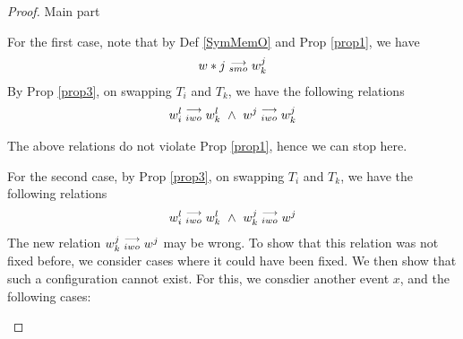\begin{proof}{Main part}
\begin{itemize}
                        For the first case, note that by Def \ref{SymMemO} and Prop \ref{prop1}, we have 
                        \begin{align*}
                            w*j\stackrel{\longrightarrow}{_{smo}}w_k^j
                        \end{align*}
                        By Prop \ref{prop3}, on swapping $T_i$ and $T_k$, we have the following relations 
                        \begin{align*}
                            \reln{w_i^l}{iwo}{w_k^l} \ \wedge \ \reln{w^j}{iwo}{w_k^j}
                        \end{align*}

                        The above relations do not violate Prop \ref{prop1}, hence we can stop here. 

                        For the second case, by Prop \ref{prop3}, on swapping $T_i$ and $T_k$, we have the following relations 
                        \begin{align*}
                            \reln{w_i^l}{iwo}{w_k^l} \ \wedge \ \reln{w_k^j}{iwo}{w^j}
                        \end{align*}
                        The new relation $w_k^j\stackrel{\longrightarrow}{_{iwo}}w^j$ may be wrong. 
                        To show that this relation was not fixed before, we consider cases where it could have been fixed. We then show that such a configuration cannot exist. For this, we consdier another event $x$, and the following cases:
                        

\end{itemize}
\end{proof}
